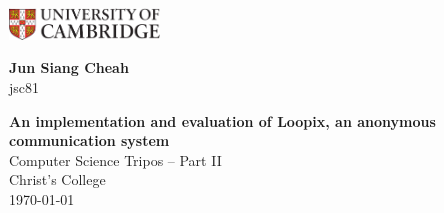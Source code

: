 \documentclass[final,dissertation.tex]{subfiles}
\begin{document}
\pagestyle{empty}

\begin{minipage}[t][][t]{0.5\textwidth}
	\includegraphics[width=40mm]{../figs/CUni.pdf}
\end{minipage}
\begin{minipage}{0.5\textwidth}
	\begin{flushright}
		\large \textbf{Jun Siang Cheah}\\
		jsc81
	\end{flushright}
\end{minipage}


\vspace*{60mm}
\begin{center}
	\Huge
	\textbf{An implementation and evaluation of Loopix, an anonymous communication system} \\[5mm]
	Computer Science Tripos -- Part II \\[5mm]
	Christ's College \\[5mm]
	\today  %
\end{center}
\end{document}
